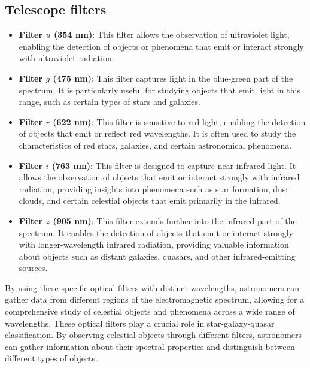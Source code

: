 \subsection{Telescope filters}
\begin{itemize}

    \item \textbf{Filter $u$ (354 nm)}: This filter allows the observation of ultraviolet light, enabling the detection of objects or phenomena that emit or interact strongly with ultraviolet radiation.

    \item \textbf{Filter $g$ (475 nm)}: This filter captures light in the blue-green part of the spectrum. It is particularly useful for studying objects that emit light in this range, such as certain types of stars and galaxies.

    \item \textbf{Filter $r$ (622 nm)}: This filter is sensitive to red light, enabling the detection of objects that emit or reflect red wavelengths. It is often used to study the characteristics of red stars, galaxies, and certain astronomical phenomena.

    \item \textbf{Filter $i$ (763 nm)}: This filter is designed to capture near-infrared light. It allows the observation of objects that emit or interact strongly with infrared radiation, providing insights into phenomena such as star formation, dust clouds, and certain celestial objects that emit primarily in the infrared.

    \item \textbf{Filter $z$ (905 nm)}: This filter extends further into the infrared part of the spectrum. It enables the detection of objects that emit or interact strongly with longer-wavelength infrared radiation, providing valuable information about objects such as distant galaxies, quasars, and other infrared-emitting sources.
 
\end{itemize}

By using these specific optical filters with distinct wavelengths, astronomers can gather data from different regions of the electromagnetic spectrum, allowing for a comprehensive study of celestial objects and phenomena across a wide range of wavelengths. These optical filters play a crucial role in star-galaxy-quasar classification. By observing celestial objects through different filters, astronomers can gather information about their spectral properties and distinguish between different types of objects.


